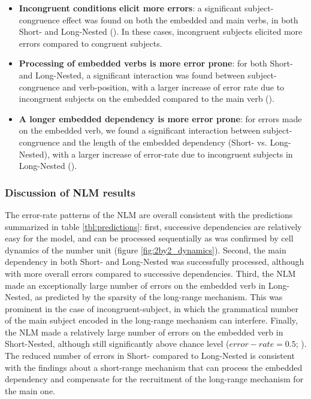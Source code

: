 \begin{itemize}
    \item \textbf{Incongruent conditions elicit more errors}: a significant subject-congruence effect was found on both the embedded and main verbs, in both Short- and Long-Nested (). In these cases, incongruent subjects elicited more errors compared to congruent subjects.
    \item \textbf{Processing of embedded verbs is more error prone}: for both Short- and Long-Nested, a significant interaction was found between subject-congruence and verb-position, with a larger increase of error rate due to incongruent subjects on the embedded compared to the main verb ().
    \item \textbf{A longer embedded dependency is more error prone}: for errors made on the embedded verb, we found a significant interaction between subject-congruence and the length of the embedded dependency (Short- vs. Long-Nested), with a larger increase of error-rate due to incongruent subjects in Long-Nested ().
\end{itemize}
 
\vspace{10pt}

\subsubsection{Discussion of NLM results}
The error-rate patterns of the NLM are overall consistent with the predictions summarized in table \ref{tbl:predictions}: first, successive dependencies are relatively easy for the model, and can be processed sequentially as was confirmed by cell dynamics of the number unit (figure \ref{fig:2by2_dynamics}). Second, the main dependency in both Short- and Long-Nested was successfully processed, although with more overall errors compared to successive dependencies. Third, the NLM made an exceptionally large number of errors on the embedded verb in Long-Nested, as predicted by the sparsity of the long-range mechanism. This was prominent in the case of incongruent-subject, in which the grammatical number of the main subject encoded in the long-range mechanism can interfere. Finally, the NLM made a relatively large number of errors on the embedded verb in Short-Nested, although still significantly above chance level ($error-rate = 0.5$; ). The reduced number of errors in Short- compared to Long-Nested is consistent with the findings about a short-range mechanism that can process the embedded dependency and compensate for the recruitment of the long-range mechanism for the main one. 

